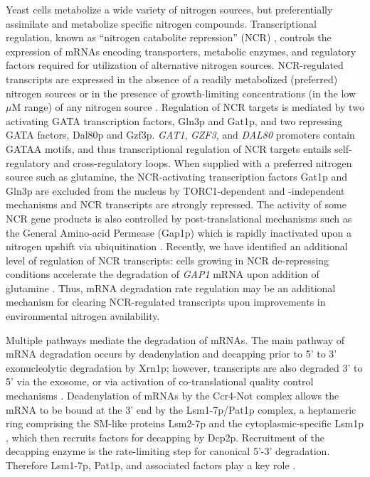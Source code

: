 Yeast cells metabolize a wide variety of nitrogen sources, but
preferentially assimilate and metabolize specific nitrogen compounds.
Transcriptional regulation, known as
“nitrogen catabolite repression” (NCR)
\parencite{magasanik2002nitrogen},
controls the expression of mRNAs
encoding transporters, metabolic enzymes, and regulatory
factors required for utilization of alternative nitrogen sources. 
NCR-regulated transcripts are expressed in the
absence of a readily metabolized (preferred) nitrogen sources or in
the presence of growth-limiting concentrations (in the low $\mu$M range)
of any nitrogen source \parencite{godard2007effect,airoldi2016steady}. Regulation
of NCR targets is mediated by two activating GATA
transcription factors, Gln3p and Gat1p, and two repressing
GATA factors, Dal80p and Gzf3p. \textit{GAT1}, \textit{GZF3}, and
\textit{DAL80} promoters
contain GATAA motifs, and thus transcriptional regulation of NCR
targets entails self-regulatory and cross-regulatory loops. When
supplied with a preferred nitrogen source such as glutamine, the
NCR-activating transcription factors Gat1p and Gln3p are excluded from
the nucleus by TORC1-dependent and -independent mechanisms
\parencite{beck1999tor,tate2013five,tate2017general} and NCR transcripts are strongly
repressed. The activity of some NCR gene
products is also controlled by post-translational mechanisms
\parencite{cooper1983function} such as the General Amino-acid Permease
(Gap1p) which is rapidly inactivated upon a nitrogen 
upshift via ubiquitination
\parencite{stanbrough1995transcriptional,risinger2006activity,merhi2012internal}. Recently, we have
identified an additional level of regulation of NCR transcripts: cells
growing in NCR de-repressing conditions accelerate the degradation
of \textit{GAP1} %
mRNA upon addition of glutamine
\parencite{airoldi2016steady}. Thus, mRNA degradation rate regulation may be an
additional mechanism for clearing NCR-regulated transcripts upon 
improvements in environmental nitrogen availability.

Multiple pathways mediate the degradation of mRNAs. The main pathway
of mRNA degradation occurs by deadenylation and decapping
prior to 5' to 3' exonucleolytic degradation by Xrn1p; however,
transcripts are also degraded 3' to 5' via the exosome, or via
activation of co-translational quality control mechanisms
\parencite{parker2012rna}. Deadenylation of mRNAs by the Ccr4-Not complex
allows the mRNA to be bound at the 3' end by the 
Lsm1-7p/Pat1p complex, a heptameric
ring comprising the SM-like proteins Lsm2-7p and the
cytoplasmic-specific Lsm1p
\parencite{tharun2000yeast,sharif2013architecture}, which then
recruits factors for decapping by Dcp2p. 
Recruitment of the decapping enzyme \parencite{coller2004eukaryotic} is the 
rate-limiting step for canonical 5'-3' degradation.
Therefore Lsm1-7p, Pat1p,
and associated factors play a key role \parencite{nissan2010decapping}. 

